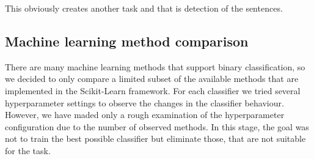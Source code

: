 This obviously creates another task and that is detection of the  sentences.






\subsection{Machine learning method comparison}

There are many machine learning methods that support binary classification, so we
decided to only compare a limited subset of the available methods that are implemented
in the Scikit-Learn framework. For each classifier we tried several hyperparameter
settings to observe the changes in the classifier behaviour. However, we have maded only
a rough examination of the hyperparameter configuration due to the number of observed
methods. In this stage, the goal was not to train the best possible classifier but
eliminate those, that are not suitable for the task.

